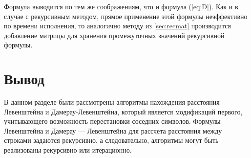 Формула выводится по тем же соображениям, что и формула (\ref{eq:D}).
Как и в случае с рекурсивным методом, прямое применение этой формулы неэффективно по времени исполнения, то аналогично методу из \ref{sec:recmat} производится добавление матрицы для хранения промежуточных значений рекурсивной формулы.

\section{Вывод}

В данном разделе были рассмотрены алгоритмы нахождения расстояния Левенштейна и Дамерау-Левенштейна, который является модификаций первого, учитывающего возможность перестановки соседних символов. Формулы Левенштейна и Дамерау — Левенштейна для рассчета расстояния между строками задаются рекурсивно, а следовательно, алгоритмы могут быть реализованы рекурсивно или итерационно.